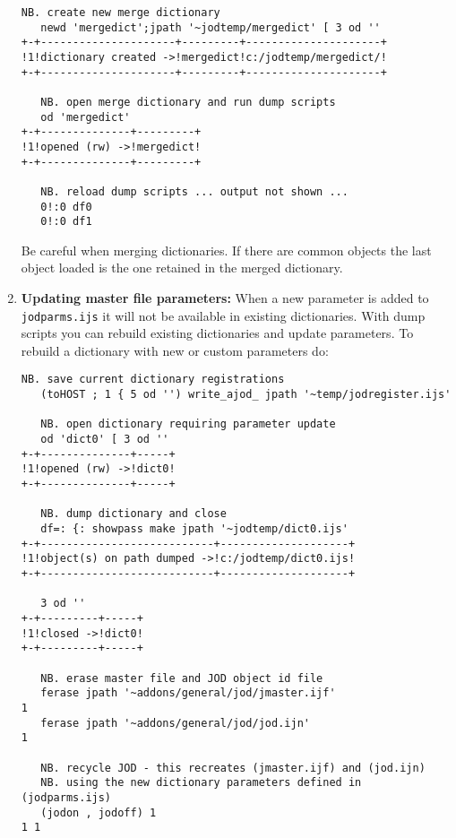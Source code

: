 \begin{enumerate}
\begin{tcolorbox}[breakable, size=fbox, boxrule=1pt, pad at break*=1mm,colback=cellbackground, colframe=cellborder]
\begin{lstlisting}[language=jdoc, frame=single,framerule=0pt,label=lst:scr5077X3]
   NB. create new merge dictionary   
   newd 'mergedict';jpath '~jodtemp/mergedict' [ 3 od ''
+-+---------------------+---------+---------------------+
!1!dictionary created ->!mergedict!c:/jodtemp/mergedict/!
+-+---------------------+---------+---------------------+

   NB. open merge dictionary and run dump scripts   
   od 'mergedict'
+-+--------------+---------+
!1!opened (rw) ->!mergedict!
+-+--------------+---------+

   NB. reload dump scripts ... output not shown ...     
   0!:0 df0     
   0!:0 df1
\end{lstlisting}
\end{tcolorbox}

  Be careful when merging dictionaries. If there are common objects the
  last object loaded is the one retained in the merged dictionary.
\item
  \textbf{Updating master file parameters:} When a new parameter is
  added to \texttt{jodparms.ijs} it will not be available in existing
  dictionaries. With dump scripts you can rebuild existing dictionaries
  and update parameters. To rebuild a dictionary with new or custom
  parameters do:

\begin{tcolorbox}[breakable, size=fbox, boxrule=1pt, pad at break*=1mm,colback=cellbackground, colframe=cellborder]
\begin{lstlisting}[language=jdoc, frame=single,framerule=0pt,label=lst:scr5077X4]
   NB. save current dictionary registrations   
   (toHOST ; 1 { 5 od '') write_ajod_ jpath '~temp/jodregister.ijs'

   NB. open dictionary requiring parameter update    
   od 'dict0' [ 3 od ''
+-+--------------+-----+
!1!opened (rw) ->!dict0!
+-+--------------+-----+

   NB. dump dictionary and close   
   df=: {: showpass make jpath '~jodtemp/dict0.ijs'
+-+---------------------------+--------------------+
!1!object(s) on path dumped ->!c:/jodtemp/dict0.ijs!
+-+---------------------------+--------------------+

   3 od ''
+-+---------+-----+
!1!closed ->!dict0!
+-+---------+-----+

   NB. erase master file and JOD object id file   
   ferase jpath '~addons/general/jod/jmaster.ijf'
1   
   ferase jpath '~addons/general/jod/jod.ijn'
1

   NB. recycle JOD - this recreates (jmaster.ijf) and (jod.ijn)    
   NB. using the new dictionary parameters defined in (jodparms.ijs)      
   (jodon , jodoff) 1
1 1


\end{lstlisting}
\end{tcolorbox}
\end{enumerate}
